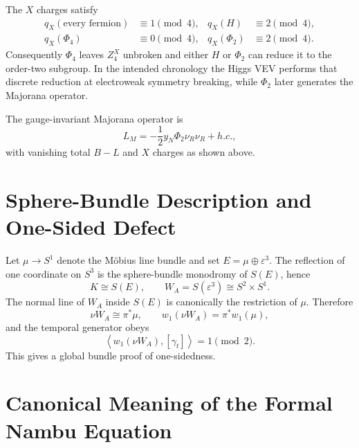 \documentclass[11pt]{article}
\theoremstyle{canonmath}
\theoremstyle{canonpostulate}
\theoremstyle{canonclaim}
\providecommand{\Klein}{\mathcal{K}}
\providecommand{\Sone}{S^1}
\def\mathrm#1{#1}%
\def\mathbb#1{#1}%
\def\mathcal#1{#1}%
\begin{document}
The $X$ charges satisfy
\begin{equation}
\begin{aligned}
q_X(\text{every fermion})&\equiv1\pmod4,
& q_X(H)&\equiv2\pmod4,\\
q_X(\Phi_4)&\equiv0\pmod4,
& q_X(\Phi_2)&\equiv2\pmod4.
\end{aligned}
\end{equation}
Consequently $\Phi_4$ leaves $\mathbb Z_4^X$ unbroken and either $H$ or $\Phi_2$ can reduce it to the order-two subgroup. In the intended chronology the Higgs VEV performs that discrete reduction at electroweak symmetry breaking, while $\Phi_2$ later generates the Majorana operator.

The gauge-invariant Majorana operator is
\begin{equation}
\mathcal L_M=-\frac12y_N\Phi_2\nu_R\nu_R+\mathrm{h.c.},
\end{equation}
with vanishing total $B-L$ and $X$ charges as shown above.

\section{Sphere-Bundle Description and One-Sided Defect}
\label{app:geometry}

Let $\mu\to\Sone$ denote the M\"obius line bundle and set $E=\mu\oplus\varepsilon^3$. The reflection of one coordinate on $S^3$ is the sphere-bundle monodromy of $S(E)$, hence
\begin{equation}
\Klein\cong S(E),
\qquad
W_A=S(\varepsilon^3)\cong S^2\times S^1.
\end{equation}
The normal line of $W_A$ inside $S(E)$ is canonically the restriction of $\mu$. Therefore
\begin{equation}
\nu W_A\cong\pi^*\mu,
\qquad
w_1(\nu W_A)=\pi^*w_1(\mu),
\end{equation}
and the temporal generator obeys
\begin{equation}
\left\langle w_1(\nu W_A),[\gamma_t]\right\rangle=1\pmod2.
\end{equation}
This gives a global bundle proof of one-sidedness.

\section{Canonical Meaning of the Formal Nambu Equation}
\label{app:modes}
\end{document}
